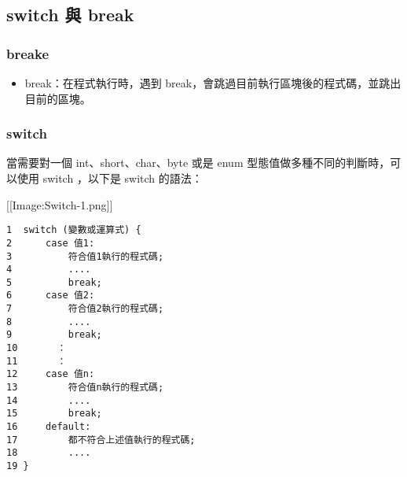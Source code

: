 \documentclass[a4paper,12pt,english]{sphinxmanual}
\begin{document}
\subsection{switch 與 break}
\label{java_cond:switch-break}

\subsubsection{breake}
\label{java_cond:breake}\begin{itemize}
\item {} 
break：在程式執行時，遇到 break，會跳過目前執行區塊後的程式碼，並跳出目前的區塊。

\end{itemize}


\subsubsection{switch}
\label{java_cond:switch}
當需要對一個 int、short、char、byte 或是 enum 型態值做多種不同的判斷時，可以使用 switch ，以下是 switch 的語法：

{[}{[}Image:Switch-1.png{]}{]}

\begin{Verbatim}[commandchars=@\[\]]
1  switch (變數或運算式) {
2      case 值1:
3          符合值1執行的程式碼;
4          ....
5          break;
6      case 值2:
7          符合值2執行的程式碼;
8          ....
9          break;
10       ：
11       ：
12     case 值n:
13         符合值n執行的程式碼;
14         ....
15         break;
16     default:
17         都不符合上述值執行的程式碼;
18         ....
19 }
\end{Verbatim}
\end{document}
